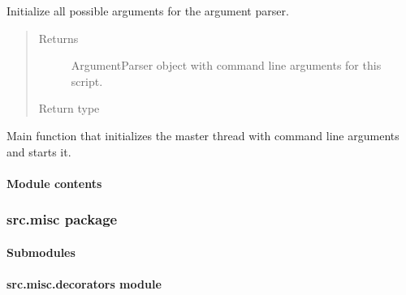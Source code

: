 \documentclass[letterpaper,10pt,english]{sphinxmanual}
\begin{document}
\begin{fulllineitems}
\label{src.mapping:src.mapping.mapthreading.init_argparse}
Initialize all possible arguments for the argument parser.
\begin{quote}\begin{description}
\item[{Returns}] \leavevmode
ArgumentParser object with command line arguments for this script.

\item[{Return type}] \leavevmode
{}

\end{description}\end{quote}

\end{fulllineitems}


\begin{fulllineitems}
\label{src.mapping:src.mapping.mapthreading.main}
Main function that initializes the master thread with command line arguments and starts it.

\end{fulllineitems}



\paragraph{Module contents}
\label{src.mapping:module-src.mapping}\label{src.mapping:module-contents}

\subsubsection{src.misc package}
\label{src.misc:src-misc-package}\label{src.misc::doc}

\paragraph{Submodules}
\label{src.misc:submodules}

\paragraph{src.misc.decorators module}
\label{src.misc:module-src.misc.decorators}\label{src.misc:src-misc-decorators-module}
\end{document}
